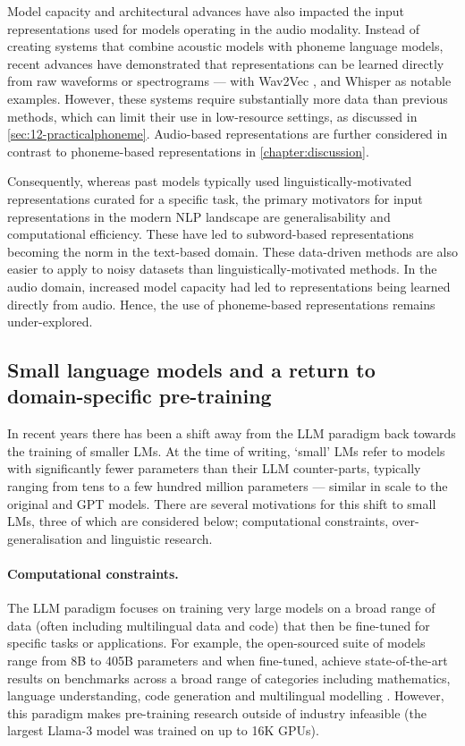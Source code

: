Model capacity and architectural advances have also impacted the input representations used for models operating in the audio modality. Instead of creating systems that combine acoustic models with phoneme language models, recent advances have demonstrated that representations can be learned directly from raw waveforms or spectrograms --- with Wav2Vec \citep{baevski2020wav2vec},  \citep{hsu2021hubert} and Whisper \citep{radford2023robust} as notable examples. However, these systems require substantially more data than previous methods, which can limit their use in low-resource settings, as discussed in \cref{sec:12-practicalphoneme}. Audio-based representations are further considered in contrast to phoneme-based representations in \cref{chapter:discussion}.

Consequently, whereas past models typically used linguistically-motivated representations curated for a specific task, the primary motivators for input representations in the modern NLP landscape are generalisability and computational efficiency. These have led to subword-based representations becoming the norm in the text-based domain. These data-driven methods are also easier to apply to noisy datasets than linguistically-motivated methods. In the audio domain, increased model capacity had led to representations being learned directly from audio. Hence, the use of phoneme-based representations remains under-explored. 


\subsection{Small language models and a return to domain-specific pre-training}\label{sec:12-domainspecific}

In recent years there has been a shift away from the LLM paradigm back towards the training of smaller LMs. At the time of writing, `small' LMs  refer to models with significantly fewer parameters than their LLM counter-parts, typically ranging from tens to a few hundred million parameters --- similar in scale to the original \bert and GPT models. There are several motivations for this shift to small LMs, three of which are considered below; computational constraints, over-generalisation and linguistic research.

\paragraph{Computational constraints.} The LLM paradigm focuses on training very large models on a broad range of data (often including multilingual data and code) that then be fine-tuned for specific tasks or applications. For example, the open-sourced  suite of models range from 8B to 405B parameters and when fine-tuned, achieve state-of-the-art results on benchmarks across a broad range of categories including mathematics, language understanding, code generation and multilingual modelling \citep{grattafiori2024llama}. However, this paradigm makes pre-training research outside of industry infeasible (the largest Llama-3 model was trained on up to 16K GPUs).

